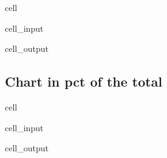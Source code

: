 \documentclass[letterpaper,10pt,english]{jupyterBook}
\begin{document}
\begin{sphinxuseclass}{cell}\begin{sphinxVerbatimInput}

\begin{sphinxuseclass}{cell_input}
\begin{sphinxVerbatim}[commandchars=\\\{\}]
\end{sphinxVerbatim}

\end{sphinxuseclass}\end{sphinxVerbatimInput}
\begin{sphinxVerbatimOutput}

\begin{sphinxuseclass}{cell_output}
\noindent{}

\end{sphinxuseclass}\end{sphinxVerbatimOutput}

\end{sphinxuseclass}

\subsection{Chart in pct of the total}
\label{\detokenize{content/06_ModelAnalytics/Attribution:chart-in-pct-of-the-total}}
\begin{sphinxuseclass}{cell}\begin{sphinxVerbatimInput}

\begin{sphinxuseclass}{cell_input}
\begin{sphinxVerbatim}[commandchars=\\\{\}]
\end{sphinxVerbatim}

\end{sphinxuseclass}\end{sphinxVerbatimInput}
\begin{sphinxVerbatimOutput}

\begin{sphinxuseclass}{cell_output}
\noindent{}

\end{sphinxuseclass}\end{sphinxVerbatimOutput}

\end{sphinxuseclass}
\end{document}
